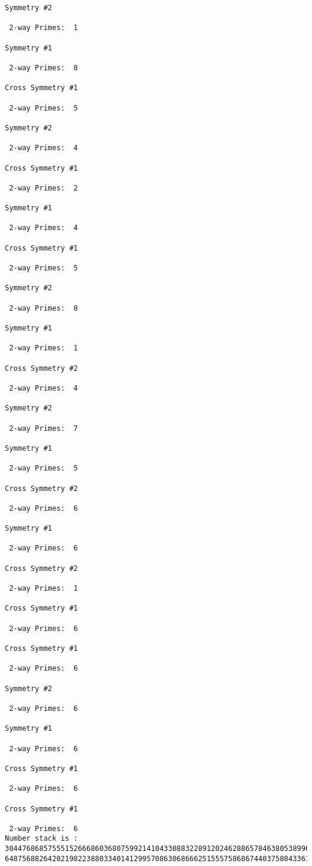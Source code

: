 \begin{verbatim}
Symmetry #2

 2-way Primes: 	1

Symmetry #1

 2-way Primes: 	8

Cross Symmetry #1

 2-way Primes: 	5

Symmetry #2

 2-way Primes: 	4

Cross Symmetry #1

 2-way Primes: 	2

Symmetry #1

 2-way Primes: 	4

Cross Symmetry #1

 2-way Primes: 	5

Symmetry #2

 2-way Primes: 	8

Symmetry #1

 2-way Primes: 	1

Cross Symmetry #2

 2-way Primes: 	4

Symmetry #2

 2-way Primes: 	7

Symmetry #1

 2-way Primes: 	5

Cross Symmetry #2

 2-way Primes: 	6

Symmetry #1

 2-way Primes: 	6

Cross Symmetry #2

 2-way Primes: 	1

Cross Symmetry #1

 2-way Primes: 	6

Cross Symmetry #1

 2-way Primes: 	6

Symmetry #2

 2-way Primes: 	6

Symmetry #1

 2-way Primes: 	6

Cross Symmetry #1

 2-way Primes: 	6

Cross Symmetry #1

 2-way Primes: 	6
Number stack is :
30447686857555152666860368075992141043308832289120246288657846380538996794608835958544046240163340857
64875688264202198223880334014129957086306866625155575868674403758043361042640445859538806497699835083


\end{verbatim}
